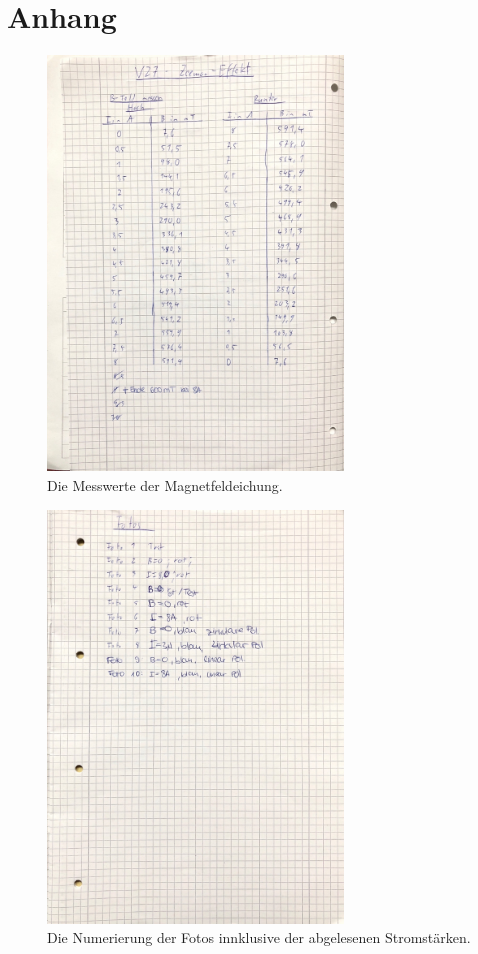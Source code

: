 \newpage
\section{Anhang}

\begin{figure}[h]
   \centering
   \includegraphics[width=0.7\textwidth]{latex/images/Zeeman1.pdf}
   \caption{Die Messwerte der Magnetfeldeichung.}
   \label{img:mess1}
\end{figure}
 
\begin{figure}[h]
   \centering
   \includegraphics[width=0.7\textwidth]{latex/images/Zeeman2.pdf}
   \caption{Die Numerierung der Fotos innklusive der abgelesenen Stromstärken.}
\end{figure}